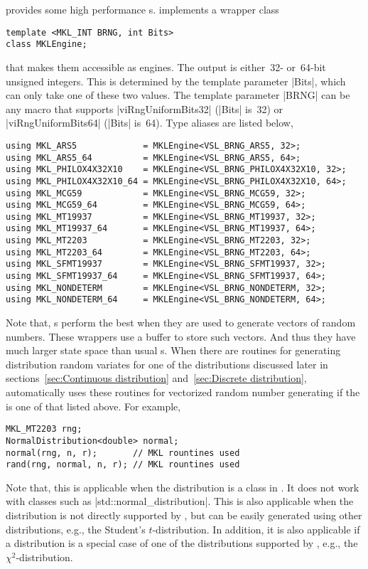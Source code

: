 \mkl provides some high performance \rng{}s. \mckl implements a wrapper class
\begin{verbatim}
template <MKL_INT BRNG, int Bits>
class MKLEngine;
\end{verbatim}
that makes them accessible as \cpp engines. The output is either~32- or~64-bit
unsigned integers. This is determined by the template parameter |Bits|, which
can only take one of these two values. The template parameter |BRNG| can be any
\mkl \brng macro that supports |viRngUniformBits32| (|Bits| is~32) or
|viRngUniformBits64| (|Bits| is~64). Type aliases are listed below,
\begin{verbatim}
using MKL_ARS5             = MKLEngine<VSL_BRNG_ARS5, 32>;
using MKL_ARS5_64          = MKLEngine<VSL_BRNG_ARS5, 64>;
using MKL_PHILOX4X32X10    = MKLEngine<VSL_BRNG_PHILOX4X32X10, 32>;
using MKL_PHILOX4X32X10_64 = MKLEngine<VSL_BRNG_PHILOX4X32X10, 64>;
using MKL_MCG59            = MKLEngine<VSL_BRNG_MCG59, 32>;
using MKL_MCG59_64         = MKLEngine<VSL_BRNG_MCG59, 64>;
using MKL_MT19937          = MKLEngine<VSL_BRNG_MT19937, 32>;
using MKL_MT19937_64       = MKLEngine<VSL_BRNG_MT19937, 64>;
using MKL_MT2203           = MKLEngine<VSL_BRNG_MT2203, 32>;
using MKL_MT2203_64        = MKLEngine<VSL_BRNG_MT2203, 64>;
using MKL_SFMT19937        = MKLEngine<VSL_BRNG_SFMT19937, 32>;
using MKL_SFMT19937_64     = MKLEngine<VSL_BRNG_SFMT19937, 64>;
using MKL_NONDETERM        = MKLEngine<VSL_BRNG_NONDETERM, 32>;
using MKL_NONDETERM_64     = MKLEngine<VSL_BRNG_NONDETERM, 64>;
\end{verbatim}
Note that, \mkl \rng{}s perform the best when they are used to generate vectors
of random numbers. These wrappers use a buffer to store such vectors. And thus
they have much larger state space than usual \rng{}s. When there are \mkl
routines for generating distribution random variates for one of the
distributions discussed later in sections~\ref{sec:Continuous distribution}
and~\ref{sec:Discrete distribution}, \mckl automatically uses these routines
for vectorized random number generating if the \rng is one of that listed
above. For example,
\begin{verbatim}
MKL_MT2203 rng;
NormalDistribution<double> normal;
normal(rng, n, r);       // MKL rountines used
rand(rng, normal, n, r); // MKL rountines used
\end{verbatim}
Note that, this is applicable when the distribution is a class in \mckl. It
does not work with classes such as |std::normal_distribution|. This is also
applicable when the distribution is not directly supported by \mkl, but can be
easily generated using other distributions, e.g., the Student's
$t$-distribution. In addition, it is also applicable if a distribution is a
special case of one of the distributions supported by \mkl, e.g., the
$\chi^2$-distribution.

